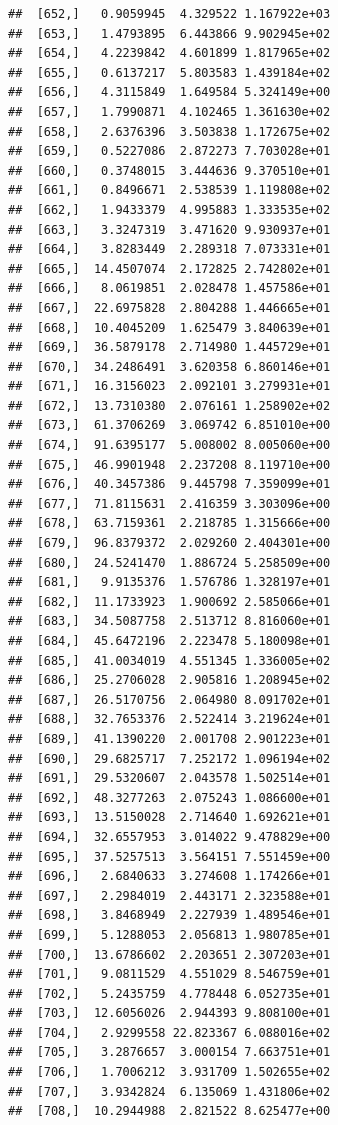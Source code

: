 \documentclass[article]{jss}\usepackage[]{graphicx}\usepackage[]{xcolor}
\makeatletter
\newenvironment{kframe}{%
 \def\at@end@of@kframe{}%
 \ifinner\ifhmode%
  \def\at@end@of@kframe{\end{minipage}}%
  \begin{minipage}{\columnwidth}%
 \fi\fi%
 \def\FrameCommand##1{\hskip\@totalleftmargin \hskip-\fboxsep
 \colorbox{shadecolor}{##1}\hskip-\fboxsep
     \hskip-\linewidth \hskip-\@totalleftmargin \hskip\columnwidth}%
 \MakeFramed {\advance\hsize-\width
   \@totalleftmargin\z@ \linewidth\hsize
   \@setminipage}}%
 {\par\unskip\endMakeFramed%
 \at@end@of@kframe}
\newenvironment{knitrout}{}{} %
\makeatother
\begin{document}
\begin{knitrout}
\begin{kframe}
\begin{verbatim}
##  [652,]   0.9059945  4.329522 1.167922e+03
##  [653,]   1.4793895  6.443866 9.902945e+02
##  [654,]   4.2239842  4.601899 1.817965e+02
##  [655,]   0.6137217  5.803583 1.439184e+02
##  [656,]   4.3115849  1.649584 5.324149e+00
##  [657,]   1.7990871  4.102465 1.361630e+02
##  [658,]   2.6376396  3.503838 1.172675e+02
##  [659,]   0.5227086  2.872273 7.703028e+01
##  [660,]   0.3748015  3.444636 9.370510e+01
##  [661,]   0.8496671  2.538539 1.119808e+02
##  [662,]   1.9433379  4.995883 1.333535e+02
##  [663,]   3.3247319  3.471620 9.930937e+01
##  [664,]   3.8283449  2.289318 7.073331e+01
##  [665,]  14.4507074  2.172825 2.742802e+01
##  [666,]   8.0619851  2.028478 1.457586e+01
##  [667,]  22.6975828  2.804288 1.446665e+01
##  [668,]  10.4045209  1.625479 3.840639e+01
##  [669,]  36.5879178  2.714980 1.445729e+01
##  [670,]  34.2486491  3.620358 6.860146e+01
##  [671,]  16.3156023  2.092101 3.279931e+01
##  [672,]  13.7310380  2.076161 1.258902e+02
##  [673,]  61.3706269  3.069742 6.851010e+00
##  [674,]  91.6395177  5.008002 8.005060e+00
##  [675,]  46.9901948  2.237208 8.119710e+00
##  [676,]  40.3457386  9.445798 7.359099e+01
##  [677,]  71.8115631  2.416359 3.303096e+00
##  [678,]  63.7159361  2.218785 1.315666e+00
##  [679,]  96.8379372  2.029260 2.404301e+00
##  [680,]  24.5241470  1.886724 5.258509e+00
##  [681,]   9.9135376  1.576786 1.328197e+01
##  [682,]  11.1733923  1.900692 2.585066e+01
##  [683,]  34.5087758  2.513712 8.816060e+01
##  [684,]  45.6472196  2.223478 5.180098e+01
##  [685,]  41.0034019  4.551345 1.336005e+02
##  [686,]  25.2706028  2.905816 1.208945e+02
##  [687,]  26.5170756  2.064980 8.091702e+01
##  [688,]  32.7653376  2.522414 3.219624e+01
##  [689,]  41.1390220  2.001708 2.901223e+01
##  [690,]  29.6825717  7.252172 1.096194e+02
##  [691,]  29.5320607  2.043578 1.502514e+01
##  [692,]  48.3277263  2.075243 1.086600e+01
##  [693,]  13.5150028  2.714640 1.692621e+01
##  [694,]  32.6557953  3.014022 9.478829e+00
##  [695,]  37.5257513  3.564151 7.551459e+00
##  [696,]   2.6840633  3.274608 1.174266e+01
##  [697,]   2.2984019  2.443171 2.323588e+01
##  [698,]   3.8468949  2.227939 1.489546e+01
##  [699,]   5.1288053  2.056813 1.980785e+01
##  [700,]  13.6786602  2.203651 2.307203e+01
##  [701,]   9.0811529  4.551029 8.546759e+01
##  [702,]   5.2435759  4.778448 6.052735e+01
##  [703,]  12.6056026  2.944393 9.808100e+01
##  [704,]   2.9299558 22.823367 6.088016e+02
##  [705,]   3.2876657  3.000154 7.663751e+01
##  [706,]   1.7006212  3.931709 1.502655e+02
##  [707,]   3.9342824  6.135069 1.431806e+02
##  [708,]  10.2944988  2.821522 8.625477e+00

\end{verbatim}
\end{kframe}
\end{knitrout}
\end{document}
